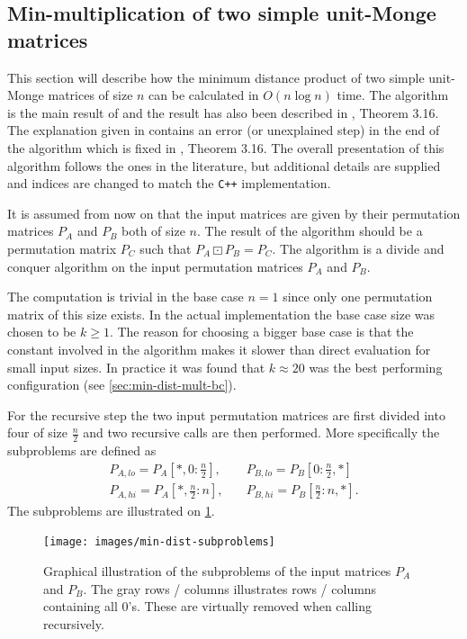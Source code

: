 \documentclass[twoside,11pt,openright]{report}
\newcommand{\refbook}[2]{\cite[#1]{DBLP:journals/corr/abs-0707-3619}, #2}
\begin{document}
\subsection{Min-multiplication of two simple unit-Monge matrices}
\label{sec:algorithm:min-mult-two-unit-monge}
This section will describe how the minimum distance product of two simple unit-Monge matrices of size $n$ can be calculated in $O(n\log{n})$ time. The algorithm is the main result of \cite{Tiskin:2010:FDM:1873601.1873704} and the result has also been described in \refbook{p. 28}{Theorem 3.16}. The explanation given in \cite{Tiskin:2010:FDM:1873601.1873704} contains an error (or unexplained step) in the end of the algorithm which is fixed in \refbook{p. 28}{Theorem 3.16}. The overall presentation of this algorithm follows the ones in the literature, but additional details are supplied and indices are changed to match the \texttt{C++} implementation.

It is assumed from now on that the input matrices are given by their permutation matrices $P_A$ and $P_B$ both of size $n$. The result of the algorithm should be a permutation matrix $P_C$ such that $P_A \boxdot P_B = P_C$. The algorithm is a divide and conquer algorithm on the input permutation matrices $P_A$ and $P_B$.

The computation is trivial in the base case $n = 1$ since only one permutation matrix of this size exists. In the actual implementation the base case size was chosen to be $k \geq 1$. The reason for choosing a bigger base case is that the constant involved in the algorithm makes it slower than direct evaluation for small input sizes. In practice it was found that $k \approx 20$ was the best performing configuration (see \cref{sec:min-dist-mult-bc}).

For the recursive step the two input permutation matrices are first divided into four of size $\frac{n}{2}$ and two recursive calls are then performed. More specifically the subproblems are defined as
\begin{align*}
  P_{A,lo} = P_A\left[*, 0 : \frac{n}{2}\right], \quad &P_{B,lo} = P_B\left[0 : \frac{n}{2}, *\right] \\
  P_{A,hi} = P_A\left[*, \frac{n}{2} : n\right], \quad &P_{B,hi} = P_B\left[\frac{n}{2} : n, *\right].
\end{align*}
The subproblems are illustrated on \cref{fig:min-mult:subproblems}.
\begin{figure}[!htb]
  \centering
  \texttt{[image: images/min-dist-subproblems]}
  \caption{Graphical illustration of the subproblems of the input matrices $P_A$ and $P_B$. The gray rows / columns illustrates rows / columns containing all $0$'s. These are virtually removed when calling recursively.}
  \label{fig:min-mult:subproblems}
\end{figure}
\end{document}
